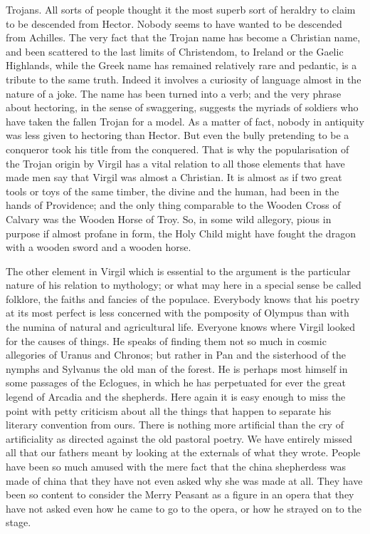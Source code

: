 Trojans. All sorts of people thought it the most superb sort of heraldry to claim to be descended from Hector. Nobody seems to have wanted to be descended from Achilles. The very fact that the Trojan name has become a Christian name, and been scattered to the last limits of Christendom, to Ireland or the Gaelic Highlands, while the Greek name has remained relatively rare and pedantic, is a tribute to the same truth. Indeed it involves a curiosity of language almost in the nature of a joke. The name has been turned into a verb; and the very phrase about hectoring, in the sense of swaggering, suggests the myriads of soldiers who have taken the fallen Trojan for a model. As a matter of fact, nobody in antiquity was less given to hectoring than Hector. But even the bully pretending to be a conqueror took his title from the conquered. That is why the popularisation of the Trojan origin by Virgil has a vital relation to all those elements that have made men say that Virgil was almost a Christian. It is almost as if two great tools or toys of the same timber, the divine and the human, had been in the hands of Providence; and the only thing comparable to the Wooden Cross of Calvary was the Wooden Horse of Troy. So, in some wild allegory, pious in purpose if almost profane in form, the Holy Child might have fought the dragon with a wooden sword and a wooden horse.

The other element in Virgil which is essential to the argument is the particular nature of his relation to mythology; or what may here in a special sense be called folklore, the faiths and fancies of the populace. Everybody knows that his poetry at its most perfect is less concerned with the pomposity of Olympus than with the numina of natural and agricultural life. Everyone knows where Virgil looked for the causes of things. He speaks of finding them not so much in cosmic allegories of Uranus and Chronos; but rather in Pan and the sisterhood of the nymphs and Sylvanus the old man of the forest. He is perhaps most himself in some passages of the Eclogues, in which he has perpetuated for ever the great legend of Arcadia and the shepherds. Here again it is easy enough to miss the point with petty criticism about all the things that happen to separate his literary convention from ours. There is nothing more artificial than the cry of artificiality as directed against the old pastoral poetry. We have entirely missed all that our fathers meant by looking at the externals of what they wrote. People have been so much amused with the mere fact that the china shepherdess was made of china that they have not even asked why she was made at all. They have been so content to consider the Merry Peasant as a figure in an opera that they have not asked even how he came to go to the opera, or how he strayed on to the stage.

